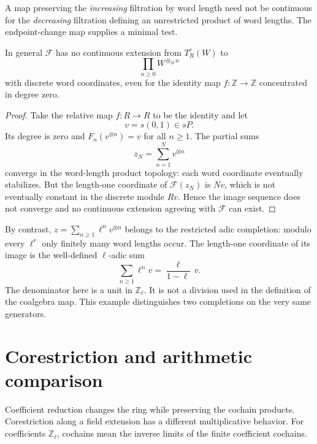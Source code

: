 A map preserving the \emph{increasing} filtration by word length need not be continuous for the \emph{decreasing} filtration defining an unrestricted product of word lengths. The endpoint-change map supplies a minimal test.

\begin{proposition}\label{v4-arith:endpoint:prop:noncontinuous}
In general $\mathcal{F}$ has no continuous extension from $T^c_R(W)$ to
\[
 \prod_{n\geq0}W^{\otimes_R n}
\]
with discrete word coordinates, even for the identity map $f:\mathbb Z\to\mathbb Z$ concentrated in degree zero.
\end{proposition}
\begin{proof}
Take the relative map $f:R\to R$ to be the identity and let
\[
 v=s(0,1)\in sP.
\]
Its degree is zero and $F_n(v^{\otimes n})=v$ for all $n\geq1$. The partial sums
\[
 z_N=\sum_{n=1}^N v^{\otimes n}
\]
converge in the word-length product topology: each word coordinate eventually stabilizes. But the length-one coordinate of $\mathcal{F}(z_N)$ is $Nv$, which is not eventually constant in the discrete module $Rv$. Hence the image sequence does not converge and no continuous extension agreeing with $\mathcal{F}$ can exist.
\end{proof}

By contrast, $z=\sum_{n\geq1}\ell^n v^{\otimes n}$ belongs to the restricted adic completion: modulo every $\ell^r$ only finitely many word lengths occur. The length-one coordinate of its image is the well-defined $\ell$-adic sum
\[
 \sum_{n\geq1}\ell^n v=\frac{\ell}{1-\ell}\,v.
\]
The denominator here is a unit in $\mathbb Z_\ell$. It is not a division used in the definition of the coalgebra map. This example distinguishes two completions on the very same generators.


\section{Corestriction and arithmetic comparison}

Coefficient reduction changes the ring while preserving the cochain products.
Corestriction along a field extension has a different multiplicative behavior.
For coefficients $\mathbb Z_\ell$, cochains mean the inverse limits of the finite coefficient cochains.

